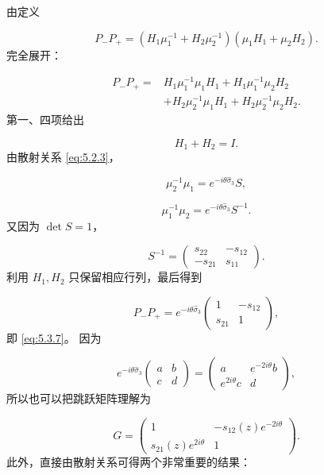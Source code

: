 \documentclass[
    lang=cn,
    scheme=chinese,
    mode=simple,
    device=normal,
    color=blue,
    math=cm,
    thmcnt=section,
    12pt,
    nowatermark
]{elegantbook}
\begin{document}
\begin{callout}
    由定义

    \[
        P_-P_+
        =
        (H_1\mu_1^{-1}+H_2\mu_2^{-1})
        (\mu_1H_1+\mu_2H_2).
    \]
    完全展开：

    \[
        \begin{aligned}
            P_-P_+
            ={} &
            H_1\mu_1^{-1}\mu_1H_1
            +
            H_1\mu_1^{-1}\mu_2H_2 \\
                & +
            H_2\mu_2^{-1}\mu_1H_1
            +
            H_2\mu_2^{-1}\mu_2H_2.
        \end{aligned}
    \]
    第一、四项给出

    \[
        H_1+H_2=I.
    \]
    由散射关系 \eqref{eq:5.2.3}，

    \[
        \mu_2^{-1}\mu_1
        =
        e^{-i\theta\widehat{\sigma}_3}S,
    \]

    \[
        \mu_1^{-1}\mu_2
        =
        e^{-i\theta\widehat{\sigma}_3}S^{-1}.
    \]
    又因为 $\det S=1$，

    \[
        S^{-1}
        =
        \begin{pmatrix}
            s_{22}  & -s_{12} \\
            -s_{21} & s_{11}
        \end{pmatrix}.
    \]
    利用 $H_1,H_2$ 只保留相应行列，最后得到

    \[
        P_-P_+
        =
        e^{-i\theta\widehat{\sigma}_3}
        \begin{pmatrix}
            1      & -s_{12} \\
            s_{21} & 1
        \end{pmatrix},
    \]
    即 \eqref{eq:5.3.7}。
    因为

    \[
        e^{-i\theta\widehat{\sigma}_3}
        \begin{pmatrix}
            a & b \\c&d
        \end{pmatrix}
        =
        \begin{pmatrix}
            a             & e^{-2i\theta}b \\
            e^{2i\theta}c & d
        \end{pmatrix},
    \]
    所以也可以把跳跃矩阵理解为

    \[
        G=
        \begin{pmatrix}
            1                     & -s_{12}(z)e^{-2i\theta} \\
            s_{21}(z)e^{2i\theta} & 1
        \end{pmatrix}.
    \]
    此外，直接由散射关系可得两个非常重要的结果：


\end{callout}
\end{document}
